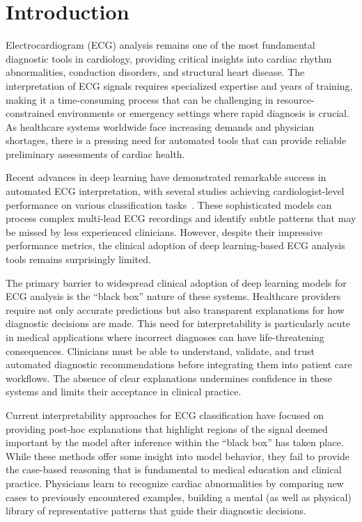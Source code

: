 
\section{Introduction}

Electrocardiogram (ECG) analysis remains one of the most fundamental diagnostic tools in cardiology, providing critical insights into cardiac rhythm abnormalities, conduction disorders, and structural heart disease. The interpretation of ECG signals requires specialized expertise and years of training, making it a time-consuming process that can be challenging in resource-constrained environments or emergency settings where rapid diagnosis is crucial. As healthcare systems worldwide face increasing demands and physician shortages, there is a pressing need for automated tools that can provide reliable preliminary assessments of cardiac health.

Recent advances in deep learning have demonstrated remarkable success in automated ECG interpretation, with several studies achieving cardiologist-level performance on various classification tasks~\cite{hannun2019cardiologist, ribeiro2020automatic}. These sophisticated models can process complex multi-lead ECG recordings and identify subtle patterns that may be missed by less experienced clinicians. However, despite their impressive performance metrics, the clinical adoption of deep learning-based ECG analysis tools remains surprisingly limited.

The primary barrier to widespread clinical adoption of deep learning models for ECG analysis is the ``black box'' nature of these systems. Healthcare providers require not only accurate predictions but also transparent explanations for how diagnostic decisions are made. This need for interpretability is particularly acute in medical applications where incorrect diagnoses can have life-threatening consequences. Clinicians must be able to understand, validate, and trust automated diagnostic recommendations before integrating them into patient care workflows. The absence of clear explanations undermines confidence in these systems and limits their acceptance in clinical practice.

Current interpretability approaches for ECG classification have focused on providing post-hoc explanations that highlight regions of the signal deemed important by the model after inference within the ``black box'' has taken place. While these methods offer some insight into model behavior, they fail to provide the case-based reasoning that is fundamental to medical education and clinical practice. Physicians learn to recognize cardiac abnormalities by comparing new cases to previously encountered examples, building a mental (as well as physical) library of representative patterns that guide their diagnostic decisions.

